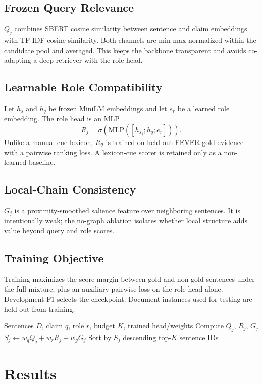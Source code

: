 \documentclass[applsci,article,submit,moreauthors]{Definitions/mdpi}
\begin{document}
\subsection{Frozen Query Relevance}
$Q_j$ combines SBERT cosine similarity between sentence and claim embeddings with TF-IDF cosine similarity. Both channels are min-max normalized within the candidate pool and averaged. This keeps the backbone transparent and avoids co-adapting a deep retriever with the role head.

\subsection{Learnable Role Compatibility}
Let $h_s$ and $h_q$ be frozen MiniLM embeddings and let $e_r$ be a learned role embedding. The role head is an MLP
\begin{equation}
R_j=\sigma\!\left(\mathrm{MLP}([h_{s_j};h_q;e_r])\right).
\end{equation}
Unlike a manual cue lexicon, $R_\theta$ is trained on held-out FEVER gold evidence with a pairwise ranking loss. A lexicon-cue scorer is retained only as a non-learned baseline.

\subsection{Local-Chain Consistency}
$G_j$ is a proximity-smoothed salience feature over neighboring sentences. It is intentionally weak; the no-graph ablation isolates whether local structure adds value beyond query and role scores.

\subsection{Training Objective}
Training maximizes the score margin between gold and non-gold sentences under the full mixture, plus an auxiliary pairwise loss on the role head alone. Development F1 selects the checkpoint. Document instances used for testing are held out from training.

\begin{algorithmic}[1]
\REQUIRE Sentences $D$, claim $q$, role $r$, budget $K$, trained head/weights
    \STATE Compute $Q_j$, $R_j$, $G_j$
    \STATE $S_j \leftarrow w_q Q_j + w_r R_j + w_g G_j$
\ENDFOR
\STATE Sort by $S_j$ descending
\RETURN top-$K$ sentence IDs
\end{algorithmic}

\section{Results}
\label{sec:experiments}
\end{document}
